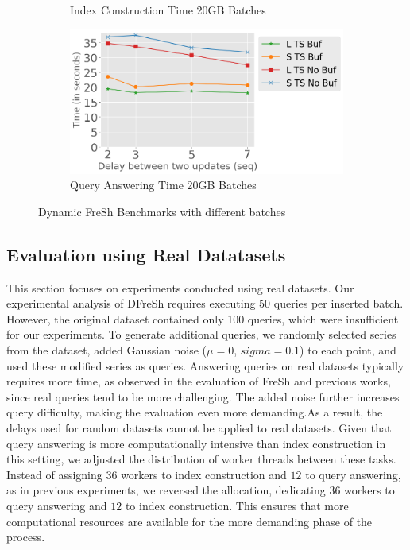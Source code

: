 \begin{figure}
\begin{subfigure}[c]{0.48\textwidth}
		\caption{Index Construction Time 20GB Batches}
		\label{fig:actual-index-Construction-time-20GB}
	\end{subfigure}
	\begin{subfigure}[c]{0.48\textwidth}
		\includegraphics[width=1\textwidth]	 {figures/Experiments/Dynamic/20GB/dataset_115343360_lockfree_Messi_Results_query_answering_initial[10485760]_delays_20GB.png}
		\caption{Query Answering Time 20GB Batches}
		\label{fig:actual-query-answering-time-20GB}
	\end{subfigure}
	\caption{Dynamic FreSh Benchmarks with different batches}
	\label{fig:dfresh-fresh-random-different-batches}
\end{figure}


\clearpage
\subsection{Evaluation using Real Datatasets}

This section focuses on experiments conducted using real datasets. Our
experimental analysis of DFreSh requires executing 50 queries per inserted
batch. However, the original dataset contained only 100 queries, which were
insufficient for our experiments. To generate additional queries, we randomly
selected series from the dataset, added Gaussian noise 
($\mu = 0$, $sigma = 0.1$) to each point, and used these modified series 
as queries. Answering queries on real datasets typically requires more time,
as observed in the evaluation of FreSh and previous works, since real queries
tend to be more challenging. The added noise further increases query difficulty,
making the evaluation even more demanding.As a result, the delays used for 
random datasets cannot be applied to real datasets. 
Given that query answering is more computationally intensive than index
construction in this setting, we adjusted the distribution of worker threads
between these tasks. Instead of assigning $36$ workers to index construction
and $12$ to query answering, as in previous experiments, we reversed the
allocation, dedicating $36$ workers to query answering and $12$ to index
construction. This ensures that more computational resources are available
for the more demanding phase of the process.

